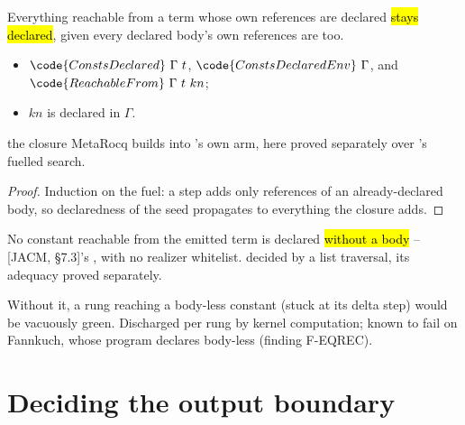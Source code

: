 \begin{lemma}
\label{lem:ReachableFrom-isSome_of_declaredEnv}
\leanok
{}
 Everything reachable from a term whose own references are declared \hl{stays declared},
given every declared body's own references are too.
\begin{itemize}
\item {} $\code{ConstsDeclared}\ \Gamma\ t$, $\code{ConstsDeclaredEnv}\ \Gamma$, and
$\code{ReachableFrom}\ \Gamma\ t\ kn$;
\item {} $kn$ is declared in $\Gamma$.
\end{itemize}
 the closure MetaRocq builds into 's own  arm, here proved
separately over 's fuelled search.
\end{lemma}
\begin{proof}
\leanok
{}
 Induction on the fuel: a step adds only references of an already-declared body, so
declaredness of the seed propagates to everything the closure adds.
\end{proof}

\begin{definition}
\label{def:NoBodylessRefs}
\leanok
{}
 No constant reachable from the emitted term is declared \hl{without a body} -- [JACM,
\S7.3]'s , with no realizer whitelist.
 decided by a list traversal, its adequacy proved separately.
\end{definition}

\begin{remark}
 Without it, a rung reaching a body-less constant (stuck at its delta step) would be
vacuously green. Discharged per rung by kernel computation; known to fail on Fannkuch, whose program
declares  body-less (finding F-EQREC).
\end{remark}

\section{Deciding the output boundary}
\label{sec:lowering:check}

